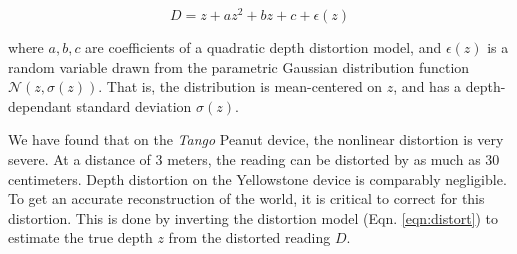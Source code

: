 \documentclass[10pt,twocolumn,letterpaper]{article}
\begin{document}
 \begin{equation}
 	D = z + a{z}^2 + b z + c+ \epsilon(z)
 	\label{eqn:distort}
 \end{equation} 
 
 \noindent where $a, b, c$ are coefficients of a quadratic depth distortion
 model, and $\epsilon(z)$ is a random variable drawn from the parametric
 Gaussian distribution function $\mathcal{N}(z, \sigma(z))$.
 That is, the distribution is mean-centered on $z$, and has a depth-dependant
 standard deviation $\sigma(z)$.
 
 We have found that on the \textit{Tango}  Peanut \cite{Tango} device, the
 nonlinear distortion is very severe. At a distance of 3 meters, the reading
 can be distorted by as much as 30 centimeters. Depth distortion on the
 Yellowstone device is comparably negligible.  To get an accurate
 reconstruction of the world, it is critical to correct for this distortion.
 This is done by inverting the distortion model (Eqn. \ref{eqn:distort}) to
 estimate the true depth $z$ from the distorted reading $D$.
  
\end{document}
